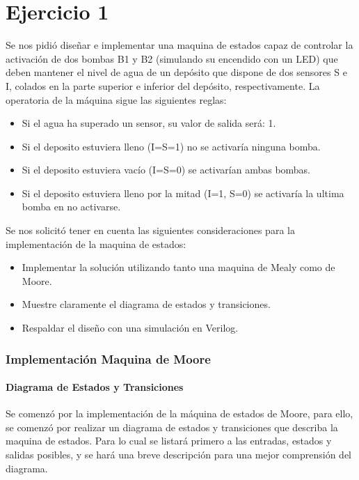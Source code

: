 \documentclass[10pt,a4paper]{article}
\begin{document}
\part*{Ejercicio 1}
Se nos pidió diseñar e implementar una maquina de estados capaz de controlar la activación de dos bombas B1 y B2 (simulando su encendido con un LED) que deben mantener el nivel de agua de un depósito que dispone de dos sensores S e I, colados en la parte superior e inferior del depósito, respectivamente. La operatoria de la máquina sigue las siguientes reglas:

\begin{itemize}
\item Si el agua ha superado un sensor, su valor de salida será: 1.
\item Si el deposito estuviera lleno (I=S=1) no se activaría ninguna bomba.
\item Si el deposito estuviera vacío (I=S=0) se activarían ambas bombas.
\item Si el deposito estuviera lleno por la mitad (I=1, S=0) se activaría la ultima bomba en no activarse. 
\end{itemize}

Se nos solicitó tener en cuenta las siguientes consideraciones para la implementación de la maquina de estados:

\begin{itemize}
\item Implementar la solución utilizando tanto una maquina de Mealy como de Moore.
\item Muestre claramente el diagrama de estados y transiciones.
\item Respaldar el diseño con una simulación en Verilog.
\end{itemize} 

\section*{Implementación Maquina de Moore}
\subsection*{Diagrama de Estados y Transiciones}

Se comenzó por la implementación de la máquina de estados de Moore, para ello, se comenzó por realizar un diagrama de estados y transiciones que describa la maquina de estados. Para lo cual se listará primero a las entradas, estados y salidas posibles, y se hará una breve descripción para una mejor comprensión del diagrama.
\end{document}
